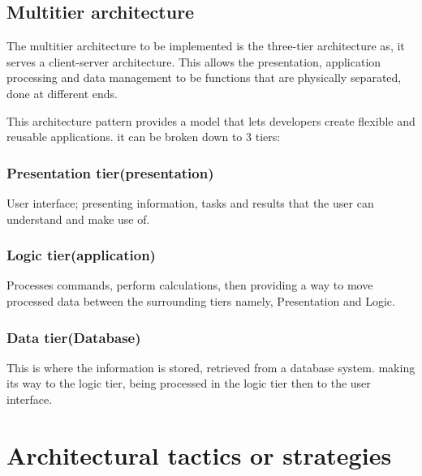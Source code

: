 \documentclass[hidelinks,a4paper,12pt]{article}
\begin{document}
\subsection{Multitier architecture}
The multitier architecture to be implemented is the three-tier architecture as, it serves a client-server architecture.
This allows the presentation, application processing and data management to be functions that are physically separated, 
done at different ends.

This architecture pattern provides a model that lets developers create flexible and reusable applications. 
it can be broken down to 3 tiers: 

\subsubsection{Presentation tier(presentation)}
User interface; presenting information, tasks and results that the
user can understand and make use of.
\subsubsection{Logic tier(application)}
Processes commands, perform calculations, then providing a way to move processed data 
between the surrounding tiers namely, Presentation and Logic.
\subsubsection{ Data tier(Database)}
This is where the information is stored, retrieved from a database system. making its way 
to the logic tier, being processed in the logic tier then to the user interface.









		\section{Architectural tactics or strategies}
		
\end{document}
